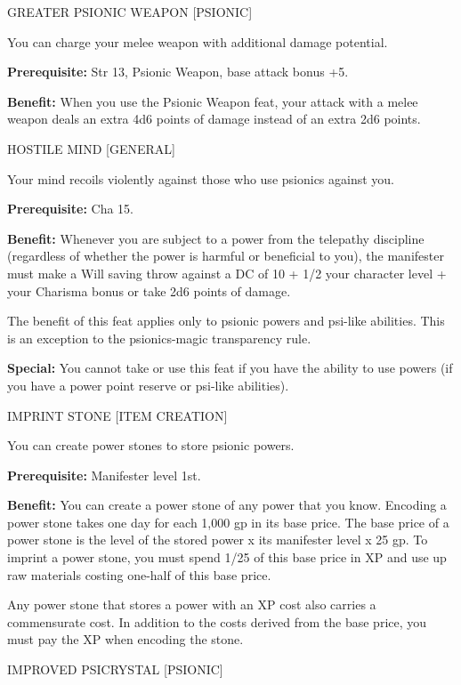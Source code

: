\documentclass{article}
\begin{document}
\vspace{12pt}
GREATER PSIONIC WEAPON [PSIONIC]

You can charge your melee weapon with additional damage potential.

\textbf{Prerequisite:} Str 13, Psionic Weapon, base attack bonus +5.

\textbf{Benefit:} When you use the Psionic Weapon feat, your attack with a melee 
weapon deals an extra 4d6 points of damage instead of an extra 2d6 points.

\vspace{12pt}
HOSTILE MIND [GENERAL]

Your mind recoils violently against those who use psionics against you.

\textbf{Prerequisite:} Cha 15.

\textbf{Benefit:} Whenever you are subject to a power from the telepathy discipline 
(regardless of whether the power is harmful or beneficial to you), the manifester 
must make a Will saving throw against a DC of 10 + 1/2 your character level + your 
Charisma bonus or take 2d6 points of damage.

The benefit of this feat applies only to psionic powers and psi-like abilities. 
This is an exception to the psionics-magic transparency rule.

\textbf{Special:} You cannot take or use this feat if you have the ability to use 
powers (if you have a power point reserve or psi-like abilities).

\vspace{12pt}
IMPRINT STONE [ITEM CREATION]

You can create power stones to store psionic powers.

\textbf{Prerequisite:} Manifester level 1st.

\textbf{Benefit:} You can create a power stone of any power that you know. Encoding 
a power stone takes one day for each 1,000 gp in its base price. The base price 
of a power stone is the level of the stored power x its manifester level x 25 gp. 
To imprint a power stone, you must spend 1/25 of this base price in XP and use 
up raw materials costing one-half of this base price.

Any power stone that stores a power with an XP cost also carries a commensurate 
cost. In addition to the costs derived from the base price, you must pay the XP 
when encoding the stone.

\vspace{12pt}
IMPROVED PSICRYSTAL [PSIONIC]
\end{document}
